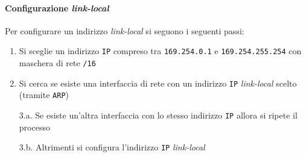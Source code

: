             \paragraph{Configurazione \textit{link-local}} Per configurare un indirizzo \textit{link-local} si seguono i seguenti passi: \begin{enumerate}
                \item Si sceglie un indirizzo \texttt{IP} compreso tra \texttt{169.254.0.1} e \texttt{169.254.255.254} con maschera di rete \texttt{/16}
                \item Si cerca se esiste una interfaccia di rete con un indirizzo \texttt{IP} \textit{link-local} scelto (tramite \texttt{ARP})
                \item[3.a.] Se esiste un'altra interfaccia con lo stesso indirizzo \texttt{IP} allora si ripete il processo
                \item[3.b.] Altrimenti si configura l'indirizzo \texttt{IP} \textit{link-local}
            \end{enumerate}
